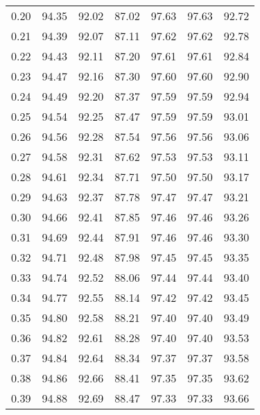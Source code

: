 \begin{tabular}{|c|c|c|c|c|c|c|}
      0.20 &     94.35 &     92.02 &      87.02 &   97.63 &      97.63 &         92.72 \\
      0.21 &     94.39 &     92.07 &      87.11 &   97.62 &      97.62 &         92.78 \\
      0.22 &     94.43 &     92.11 &      87.20 &   97.61 &      97.61 &         92.84 \\
      0.23 &     94.47 &     92.16 &      87.30 &   97.60 &      97.60 &         92.90 \\
      0.24 &     94.49 &     92.20 &      87.37 &   97.59 &      97.59 &         92.94 \\
      0.25 &     94.54 &     92.25 &      87.47 &   97.59 &      97.59 &         93.01 \\
      0.26 &     94.56 &     92.28 &      87.54 &   97.56 &      97.56 &         93.06 \\
      0.27 &     94.58 &     92.31 &      87.62 &   97.53 &      97.53 &         93.11 \\
      0.28 &     94.61 &     92.34 &      87.71 &   97.50 &      97.50 &         93.17 \\
      0.29 &     94.63 &     92.37 &      87.78 &   97.47 &      97.47 &         93.21 \\
      0.30 &     94.66 &     92.41 &      87.85 &   97.46 &      97.46 &         93.26 \\
      0.31 &     94.69 &     92.44 &      87.91 &   97.46 &      97.46 &         93.30 \\
      0.32 &     94.71 &     92.48 &      87.98 &   97.45 &      97.45 &         93.35 \\
      0.33 &     94.74 &     92.52 &      88.06 &   97.44 &      97.44 &         93.40 \\
      0.34 &     94.77 &     92.55 &      88.14 &   97.42 &      97.42 &         93.45 \\
      0.35 &     94.80 &     92.58 &      88.21 &   97.40 &      97.40 &         93.49 \\
      0.36 &     94.82 &     92.61 &      88.28 &   97.40 &      97.40 &         93.53 \\
      0.37 &     94.84 &     92.64 &      88.34 &   97.37 &      97.37 &         93.58 \\
      0.38 &     94.86 &     92.66 &      88.41 &   97.35 &      97.35 &         93.62 \\
      0.39 &     94.88 &     92.69 &      88.47 &   97.33 &      97.33 &         93.66 \\

\end{tabular}

